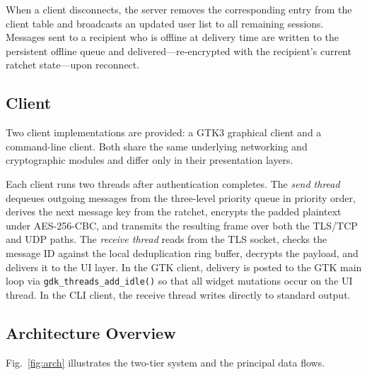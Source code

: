 \documentclass[conference]{IEEEtran}
\begin{document}
When a client disconnects, the server removes the corresponding entry from the client
table and broadcasts an updated user list to all remaining sessions. Messages sent to a
recipient who is offline at delivery time are written to the persistent offline queue
and delivered—re-encrypted with the recipient's current ratchet state—upon reconnect.

\subsection{Client}

Two client implementations are provided: a GTK3 graphical client and a command-line
client. Both share the same underlying networking and cryptographic modules and differ
only in their presentation layers.

Each client runs two threads after authentication completes. The \emph{send thread}
dequeues outgoing messages from the three-level priority queue in priority order,
derives the next message key from the ratchet, encrypts the padded plaintext under
AES-256-CBC, and transmits the resulting frame over both the TLS/TCP and UDP paths.
The \emph{receive thread} reads from the TLS socket, checks the message ID against the
local deduplication ring buffer, decrypts the payload, and delivers it to the UI layer.
In the GTK client, delivery is posted to the GTK main loop via
\texttt{gdk\_threads\_add\_idle()} so that all widget mutations occur on the UI
thread. In the CLI client, the receive thread writes directly to standard output.

\subsection{Architecture Overview}

Fig.~\ref{fig:arch} illustrates the two-tier system and the principal data flows.
\end{document}

